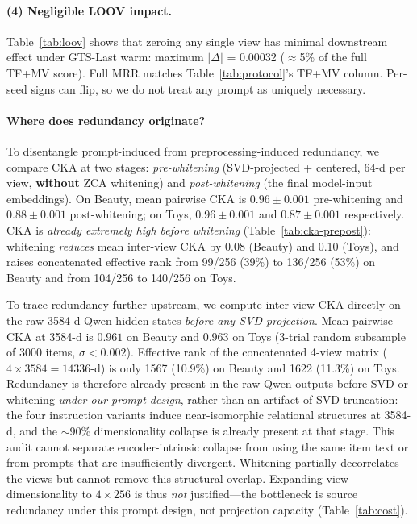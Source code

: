 \documentclass[sigconf,natbib=true,anonymous]{acmart}
\newcommand{\tfmv}{\textsc{TF+MV}\xspace}
\begin{document}
\paragraph{(4) Negligible LOOV impact.}
Table~\ref{tab:loov} shows that zeroing any single view has minimal downstream effect under GTS-Last warm: maximum $|\Delta|$ = 0.00032 ($\approx$5\% of the full \tfmv score).
Full MRR matches Table~\ref{tab:protocol}'s \tfmv column.
Per-seed signs can flip, so we do not treat any prompt as uniquely necessary.

\paragraph{Where does redundancy originate?}
To disentangle prompt-induced from preprocessing-induced redundancy, we compare CKA at two stages: \emph{pre-whitening} (SVD-projected + centered, 64-d per view, \textbf{without} ZCA whitening) and \emph{post-whitening} (the final model-input embeddings).
On Beauty, mean pairwise CKA is $0.96\pm0.001$ pre-whitening and $0.88\pm0.001$ post-whitening; on Toys, $0.96\pm0.001$ and $0.87\pm0.001$ respectively.
CKA is \emph{already extremely high before whitening} (Table~\ref{tab:cka-prepost}): whitening \emph{reduces} mean inter-view CKA by 0.08 (Beauty) and 0.10 (Toys), and raises concatenated effective rank from 99/256 (39\%) to 136/256 (53\%) on Beauty and from 104/256 to 140/256 on Toys.

To trace redundancy further upstream, we compute inter-view CKA directly on the raw 3584-d Qwen hidden states \emph{before any SVD projection}.
Mean pairwise CKA at 3584-d is $0.961$ on Beauty and $0.963$ on Toys (3-trial random subsample of 3000 items, $\sigma < 0.002$).
Effective rank of the concatenated 4-view matrix ($4\times 3584 = 14336$-d) is only 1567 (10.9\%) on Beauty and 1622 (11.3\%) on Toys.
Redundancy is therefore already present in the raw Qwen outputs before SVD or whitening \emph{under our prompt design}, rather than an artifact of SVD truncation: the four instruction variants induce near-isomorphic relational structures at 3584-d, and the $\sim$90\% dimensionality collapse is already present at that stage.
This audit cannot separate encoder-intrinsic collapse from using the same item text or from prompts that are insufficiently divergent.
Whitening partially decorrelates the views but cannot remove this structural overlap.
Expanding view dimensionality to $4\times256$ is thus \emph{not} justified---the bottleneck is source redundancy under this prompt design, not projection capacity (Table~\ref{tab:cost}).
\end{document}

